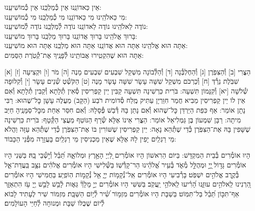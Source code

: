 \documentclass[twoside, openany, parskip=half, 11pt]{book}
\begin{document}
\nextpage

\fullkaddish




\label{einkelokeinu}
\hfill אֵין כַּאדוֹנֵֽנוּ \hfill אֵין כְּ֯מַלְכֵּֽנוּ \hfill אֵין כְּ֯מוֹשִׁיעֵֽנוּ:\\
מִי כֵאלֹהֵֽינוּ \hfill מִי כַאדוֹנֵֽנוּ \hfill מִי כְ֯מַלְכֵּֽנוּ \hfill מִי כְ֯מוֹשִׁיעֵֽנוּ:\\
נוֹדֶה לֵאלֹהֵֽינוּ \hfill נוֹדֶה לַאדוֹנֵֽנוּ \hfill נוֹדֶה לְ֯מַלְכֵּֽנוּ \hfill נוֹדֶה לְ֯מוֹשִׁיעֵֽנוּ:\\
בָּרוּךְ אֱלֹהֵֽינוּ \hfill בָּרוּךְ אֲדוֹנֵֽנוּ \hfill בָּרוּךְ מַלְכֵּֽנוּ \hfill בָּרוּךְ מוֹשִׁיעֵֽנוּ:\\
אַתָּה הוּא אֱלֹהֵֽינוּ אַתָּה הוּא אֲדוֹנֵֽנוּ אַתָּה הוּא מַלְכֵּֽנוּ אַתָּה הוּא מוֹשִׁיעֵֽנוּ:\\
אַתָּה הוּא שֶׁהִקְטִֽירוּ אֲבוֹתֵֽינוּ לְ֯פָנֶֽיךָ אֶת־קְ֯טֹֽרֶת הַסַּמִּים:

[א] הַצֳּרִי [ב] וְ֯הַצִּפֹּֽרֶן [ג] וְ֯הַחֶלְבְּ֯נָה [ד] וְ֯הַלְּ֯בוֹנָה מִשְׁקַל שִׁבְעִים שִׁבְעִים מָנֶה [ה] מֹר [ו] וּקְצִיעָה [ז] שִׁבֹּֽלֶת נֵרְ֯דְּ [ח] וְ֯כַרְכֹּם מִשְׁקַל שִׁשָּׁה עָשָׂר שִׁשָּׁה עָשָׂר מָנֶה [ט] הַקֹּשְׁ֯טְ שְׁ֯נֵים עָשָׂר [י] וְ֯קִלּוּפָה שְׁ֯לֹשָׁה [יא] וְ֯קִנָּמוֹן תִּשְׁעָה: בֹּרִית כַּרְשִׁינָה תִּשְׁעָה קַבִּין יֵין קַפְרִיסִין סְ֯אִין תְּ֯לָתָא וְ֯קַבִּין תְּ֯לָתָא וְ֯אִם אֵין לוֹ יֵין קַפְרִיסִין מֵבִיא חֲמַר חִוַּרְיָן עַתִּיק מֶֽלַח סְ֯דוֹמִית רֹבַע (הַקָּב) מַעֲלֶה עָשָׁן כׇּל־שֶׁהוּא: רַבִּי נָתָן אוֹמֵר: אַף כִּפַּת הַיַּרְדֵּן כׇּל־שֶׁהוּא וְ֯אִם נָתַן בָּהּ דְּ֯בַשׁ פְּ֯סָלָהּ: וְ֯אִם חִסַּר אַחַת מִכׇּל־סַמָּנֶֽיהָ חַיַּב מִיתָה: רַבָּן שִׁמְעוֹן בֶּן גַּמְלִיאֵל אוֹמֵר: הַצֳּרִי אֵינוֹ אֶלָּא שְׂ֯רָף הַנּוֹטֵף מֵעֲצֵי הַקְּ֯טָף: בֹּרִית כַּרְשִׁינָה שֶׁשָּׁפִין בָּהּ אֶת־הַצִּפֹּֽרֶן כְּ֯דֵי שֶׁתְּ֯הֵא נָאָה: יֵין קַפְרִיסִין שֶׁשּׁוֹרִין בּוֹ אֶת־הַצִּפֹּֽרֶן כְּ֯דֵי שֶׁתְּ֯הֵא עַזָּה וַהֲלֹא מֵי רַגְלַֽיִם יָפִין לָהּ אֶלָּא שֶׁאֵין מַכְנִיסִין מֵי רַגְלַֽיִם בָּעֲזָרָה מִפְּ֯נֵי הַכָּבוֹד:

\vspace{-.3\baselineskip}
הָיוּ אוֹמְ֯רִים בְּ֯בֵית הַמִּקְדָּשׁ:
בַּיּוֹם הַרִאשׁוֹן הָיוּ אוֹמְ֯רִים לַ֭יְיָ הָאָ֣רֶץ וּמְלוֹאָ֑הּ תֵּ֝בֵ֗ל וְ֯י֣שְׁ֯בֵי בָֽהּ׃
בַּשֵּׁנִי הָיוּ אוֹמְ֯רִים גָּד֣וֹל ֖יְיָ֣ וּמְהֻלָּ֣ל מְ֯אֹ֑ד בְּ֯עִ֥יר אֱ֝לֹהֵ֗ינוּ הַר־קָדְ֯שֽׁוֹ׃
בַּשְּׁ֯לִישִׁי הָיוּ אוֹמְ֯רִים אֱלֹהִ֗ים נִצָּ֥ב בַּֽעֲדַת־אֵ֑ל בְּ֯קֶ֖רֶב אֱלֹהִ֣ים יִשְׁפֹּֽט׃ בָּרְ֯בִיעִי הָיוּ אוֹמְ֯רִים אֵֽל־נְ֯קָמ֥וֹת יְיָ֑ אֵ֖ל נְ֯קָמ֣וֹת הֽוֹפִֽיַע׃ בַּחֲמִישִׁי הָיוּ אוֹמְ֯רִים הַ֭רְנִינוּ לֵֽאלֹהִ֣ים עוּזֵּ֑נוּ הָ֝רִ֗יעוּ לֵֽאלֹהֵ֥י יַֽעֲקֹֽב׃ בַּשִּׁשִּׁי הָיוּ אוֹמְ֯רִים יְיָ֣ מָלָךְ֘ גֵּא֢וּת לָ֫בֵ֥שׁ לָבֵ֣שׁ יְ֖יָ עֹ֥ז הִתְאַזָּ֑ר אַף־תִּכּ֣וֹן תֵּ֝בֵ֗ל בַּל־תִּמּֽוֹט׃ בַּשַׁבָּת הָיוּ אוֹמְ֯רִים מִזְמ֥וֹר שִׁ֝֗יר לְ֯י֥וֹם הַשַּׁבָּֽת׃ מִזְמוֹר שִׁיר לֶעָתִיד לָבוֹא לְ֯יוֹם שֶׁכֻּלּוֹ שַׁבָּת וּמְנוּחָה לְ֯חַיֵּי הָעוֹלָמִים׃
\end{document}
